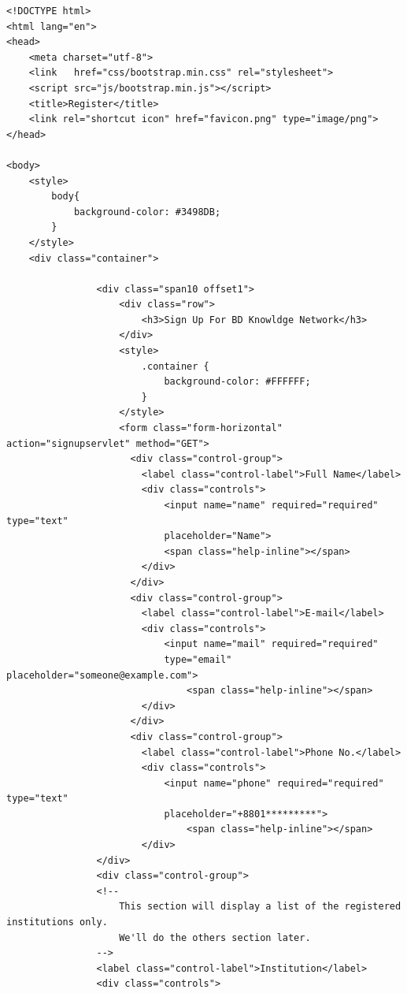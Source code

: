 \documentclass{scrreprt}
\begin{document}
\begin{verbatim}
<!DOCTYPE html>
<html lang="en">
<head>
    <meta charset="utf-8">
    <link   href="css/bootstrap.min.css" rel="stylesheet">
    <script src="js/bootstrap.min.js"></script>
    <title>Register</title>
    <link rel="shortcut icon" href="favicon.png" type="image/png">
</head>
 
<body>
    <style>
        body{
            background-color: #3498DB;
        }
    </style>
    <div class="container">
        
                <div class="span10 offset1">
                    <div class="row">
                        <h3>Sign Up For BD Knowldge Network</h3>
                    </div>
                    <style>
                        .container {
                            background-color: #FFFFFF;
                        }
                    </style>
                    <form class="form-horizontal" action="signupservlet" method="GET">
                      <div class="control-group">
                        <label class="control-label">Full Name</label>
                        <div class="controls">
                            <input name="name" required="required" type="text"  
                            placeholder="Name">
                            <span class="help-inline"></span>
                        </div>
                      </div>
                      <div class="control-group">
                        <label class="control-label">E-mail</label>
                        <div class="controls">
                            <input name="mail" required="required" 
                            type="email" placeholder="someone@example.com">
                                <span class="help-inline"></span>
                        </div>
                      </div>
                      <div class="control-group">
                        <label class="control-label">Phone No.</label>
                        <div class="controls">
                            <input name="phone" required="required" type="text" 
                            placeholder="+8801*********">
                                <span class="help-inline"></span>
                        </div>
                </div>
                <div class="control-group">
                <!-- 
                    This section will display a list of the registered institutions only.
                    We'll do the others section later. 
                -->
                <label class="control-label">Institution</label>
                <div class="controls">

\end{verbatim}
\end{document}
